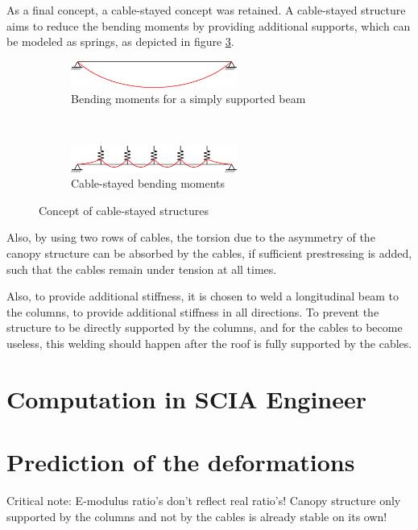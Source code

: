 \documentclass[a4paper]{article}
\begin{document}
As a final concept, a cable-stayed concept was retained. A cable-stayed structure aims to reduce the bending moments by providing additional supports, which can be modeled as springs, as depicted in figure \ref{fig:comparison}.

\begin{figure}[h]
\begin{subfigure}[b]{\textwidth}
	\centering
	\includegraphics[width=0.6\textwidth]{simplemoment}
	\caption{Bending moments for a simply supported beam}
	\label{fig:simplemoment}
\end{subfigure}
\\[7mm]
\begin{subfigure}[b]{\textwidth}
	\centering
	\includegraphics[width=0.6\textwidth]{cablemoment}
	\caption{Cable-stayed bending moments}
	\label{fig:simplemoment}
\end{subfigure}
\caption{Concept of cable-stayed structures}
\label{fig:comparison}
\end{figure}

Also, by using two rows of cables, the torsion due to the asymmetry of the canopy structure can be absorbed by the cables, if sufficient prestressing is added, such that the cables remain under tension at all times.

Also, to provide additional stiffness, it is chosen to weld a longitudinal beam to the columns, to provide additional stiffness in all directions. To prevent the structure to be directly supported by the columns, and for the cables to become useless, this welding should happen after the roof is fully supported by the cables.

\section{Computation in SCIA Engineer}

\section{Prediction of the deformations}

Critical note: E-modulus ratio's don't reflect real ratio's! Canopy structure only supported by the columns and not by the cables is already stable on its own!
\end{document}
